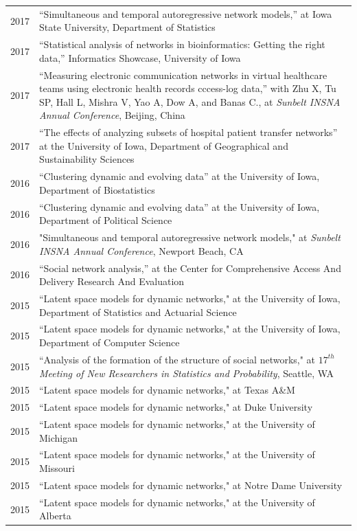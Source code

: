\documentclass[11pt]{article}
\begin{document}
\begin{longtable}{r|p{15.5cm}}
2017 & ``Simultaneous and temporal autoregressive network models,'' at Iowa State University, Department of Statistics \\
2017 & ``Statistical analysis of networks in bioinformatics: Getting the right data,'' Informatics Showcase, University of Iowa\\
2017 & ``Measuring electronic communication networks in virtual healthcare teams using electronic health records cccess-log data,'' with Zhu X, Tu SP, Hall L, Mishra V, Yao A, Dow A, and Banas C., at {\it Sunbelt INSNA Annual Conference}, Beijing, China \\
2017 & ``The effects of analyzing subsets of hospital patient transfer networks'' at the University of Iowa, Department of Geographical and Sustainability Sciences \\
2016 & ``Clustering dynamic and evolving data'' at the University of Iowa, Department of Biostatistics \\
2016 & ``Clustering dynamic and evolving data'' at the University of Iowa, Department of Political Science \\
2016 &"Simultaneous and temporal autoregressive network models," at {\it Sunbelt INSNA Annual Conference}, Newport Beach, CA \\
2016 &``Social network analysis,'' at the Center for Comprehensive Access And Delivery Research And Evaluation \\
2015 & ``Latent space models for dynamic networks," at the University of Iowa, Department of Statistics and Actuarial Science \\
2015 &``Latent space models for dynamic networks," at the University of Iowa, Department of Computer Science \\
2015 & ``Analysis of the formation of the structure of social networks," at {\it $17^{th}$ Meeting of New Researchers in Statistics and Probability}, Seattle, WA \\
2015 & ``Latent space models for dynamic networks," at Texas A\&M \\
2015 & ``Latent space models for dynamic networks," at Duke University \\
2015 & ``Latent space models for dynamic networks," at the University of Michigan \\
2015 & ``Latent space models for dynamic networks," at the University of Missouri \\
2015 & ``Latent space models for dynamic networks," at Notre Dame University \\
2015 & ``Latent space models for dynamic networks," at the University of Alberta \\

\end{longtable}
\end{document}
